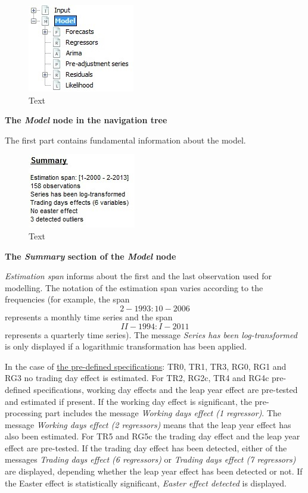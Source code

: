 \documentclass[
  letterpaper,
  DIV=11,
  numbers=noendperiod]{scrreprt}
\begin{document}
\begin{figure}

{\centering \includegraphics{./All_images/image22_RMSB.jpg}

}

\caption{Text}

\end{figure}

\textbf{The \emph{Model} node in the navigation tree}

The first part contains fundamental information about the model.

\begin{figure}

{\centering \includegraphics{./All_images/image23_RMSB.jpg}

}

\caption{Text}

\end{figure}

\textbf{The \emph{Summary} section of the \emph{Model} node}

\emph{Estimation span} informs about the first and the last observation
used for modelling. The notation of the estimation span varies according
to the frequencies (for example, the span \[2-1993 : 10-2006\]
represents a monthly time series and the span \[II-1994 : I-2011\]
represents a quarterly time series). The message \emph{Series has been
log-transformed} is only displayed if a logarithmic transformation has
been applied.

In the case of
\href{../reference-manual/modelling-specifications.html}{the pre-defined
specifications}: TR0, TR1, TR3, RG0, RG1 and RG3 no trading day effect
is estimated. For TR2, RG2c, TR4 and RG4c pre-defined specifications,
working day effects and the leap year effect are pre-tested and
estimated if present. If the working day effect is significant, the
pre-processing part includes the message \emph{Working days effect (1
regressor)}. The message \emph{Working days effect (2 regressors)} means
that the leap year effect has also been estimated. For TR5 and RG5c the
trading day effect and the leap year effect are pre-tested. If the
trading day effect has been detected, either of the messages
\emph{Trading days effect (6 regressors)} or \emph{Trading days effect
(7 regressors)} are displayed, depending whether the leap year effect
has been detected or not. If the Easter effect is statistically
significant, \emph{Easter effect detected} is displayed.
\end{document}
